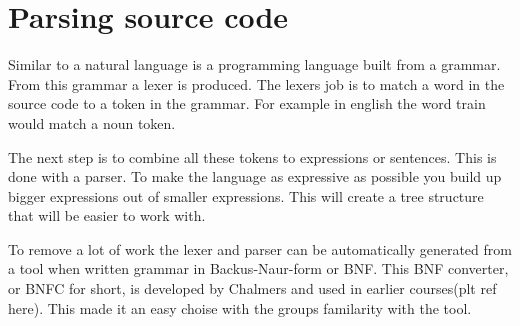 \section{Parsing source code} \label{sec:bnfc}


Similar to a natural language is a programming language built from a grammar. 
From this grammar a lexer is produced. The lexers job is to match a word in the
source code to a token in the grammar. For example in english the word train 
would match a noun token. 

The next step is to combine all these tokens to expressions or sentences. This
is done with a parser. To make the language as expressive as possible you build
up bigger expressions out of smaller expressions. This will create a tree
structure that will be easier to work with. 

To remove a lot of work the lexer and parser can be automatically generated from
a tool when written grammar in Backus-Naur-form or BNF. This BNF converter, or
BNFC for short, is developed by Chalmers and used in earlier courses(plt ref here).
This made it an easy choise with the groups familarity with the tool. 


